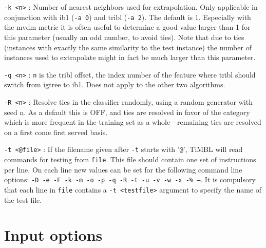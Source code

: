 \documentclass{report}
\begin{document}
\begin{description}
\item {\tt -k <n>} : Number of nearest neighbors used for
extrapolation. Only applicable in conjunction with {\sc ib1} ({\tt -a
0}) and {\sc tribl} ({\tt -a 2}). The default is 1. Especially with
the {\sc mvdm} metric it is often useful to determine a good value
larger than 1 for this parameter (usually an odd number, to avoid
ties). Note that due to ties (instances with exactly the same
similarity to the test instance) the number of instances used to
extrapolate might in fact be much larger than this parameter.

\item {\tt -q <n>} : {\tt n} is the {\sc tribl} offset, the index
number of the feature where {\sc tribl} should switch from {\sc
igtree} to {\sc ib1}. Does not apply to the other two algorithms.

\item {\tt -R <n>} : Resolve ties in the classifier randomly, using a
random generator with seed n. As a default this is OFF, and ties are
resolved in favor of the category which is more frequent in the
training set as a whole---remaining ties are resolved on a first come
first served basis.

\item {\tt -t <@file>} : If the filename given after {\tt -t} starts
with '{\tt @}', TiMBL will read commands for testing from {\tt file}.
This file should contain one set of instructions per line. On each
line new values can be set for the following command line options:
{\tt -D -e -F -k -m -o -p -q -R -t -u -v -w -x -\% --}. It is compulsory
that each line in {\tt file} contains a {\tt -t <testfile>} argument
to specify the name of the test file.

\end{description}

\section{Input options}
\end{document}
